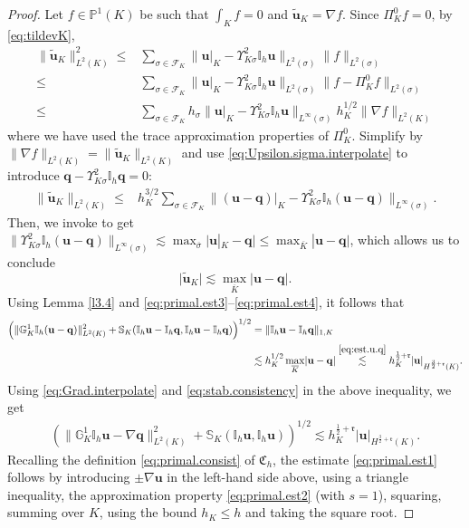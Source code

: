 \documentclass[a4paper,11pt]{article}
\theoremstyle{definition}
\theoremstyle{remark}
\newcommand{\norm}[2]{\|#2\|_{#1}}
\newcommand{\bo}[1]{\mathbf{#1}}
\newcommand{\bos}[1]{\boldsymbol{#1}}
\newcommand{\up}[1]{\Upsilon^2_{#1}}
\newcommand{\dgr}[1]{\mathbb G^1_{#1}}
\newcommand{\mI}[1]{\mathbb I_h\bo{#1}}
\def\P{\mathbb{P}}
\def\cF{\mathcal{F}}
\def\fr{\mathfrak{r}}
\def\fC{\mathfrak{C}}
\def\Ksig{{K\!\sigma}}
\begin{document}
\begin{proof}
Let $f\in\P^1(K)$ be such that $\int_K f=0$ and $\widetilde{\bo{u}}_K=\nabla f.$ Since $\Pi^0_Kf=0$, by \eqref{eq:tildevK},
\begin{align*}
\norm{L^2(K)}{\widetilde{\bo{u}}_K}^2\le{}&\sum_{\sigma\in\cF_K}\norm{L^2(\sigma)}{\bo{u}|_K-\up{\Ksig}\mathbb I_h\bo{u}}\norm{L^2(\sigma)}{f}\\
\le{}&\sum_{\sigma\in\cF_K}\norm{L^2(\sigma)}{\bo{u}|_K-\up{\Ksig}\mathbb I_h\bo{u}}\norm{L^2(\sigma)}{f-\Pi^0_K f}\\
\le{}&\sum_{\sigma\in\cF_K}h_\sigma\norm{L^\infty(\sigma)}{\bo{u}|_K-\up{\Ksig}\mathbb I_h\bo{u}}h_K^{1/2}\norm{L^2(K)}{\nabla f}
\end{align*}
where we have used the trace approximation properties of $\Pi^0_K$. Simplify by $\norm{L^2(K)}{\nabla f}=\norm{L^2(K)}{\widetilde{\bo{u}}_K}$ and use \eqref{eq:Upsilon.sigma.interpolate} to introduce $\bo{q}-\up{\Ksig}\mathbb I_h\bo{q}=0$:
\begin{align*}
\norm{L^2(K)}{\widetilde{\bo{u}}_K}\le{}&h_K^{3/2}\sum_{\sigma\in\cF_K}\norm{L^\infty(\sigma)}{(\bo{u}-\bo{q})|_K-\up{\Ksig}\mI{(\bo{u}-\bo{q})}}.
\end{align*}
Then, we invoke \cite[(A.10)]{Di-Pietro.Droniou.ea:24} to get $\norm{L^\infty(\sigma)}{\up{\Ksig}\mI{(\bo{u}-\bo{q})}}\lesssim \max_{\overline{\sigma}}\big|\bo{u}|_K-\bo{q}\big|\le \max_{\overline{K}}|\bo{u}-\bo{q}|$,
which allows us to conclude
\begin{equation}\label{eq:primal.est4}
\lvert\widetilde{\bo{u}}_K\rvert\lesssim \max\limits_{\overline{K}}\lvert\bo{u-q}\rvert.
\end{equation}
Using Lemma \ref{l3.4} and \eqref{eq:primal.est3}–\eqref{eq:primal.est4}, it follows that
\begin{align*}
\left(\lVert \dgr{K}\mI{(u-q)}\rVert^2_{L^2(K)}+\mathbb S_K(\mI{u}-\mI{q},\mI{u}-\mI{q})\right)^{1/2}&=\lVert \mI{u}-\mI{q}\rVert_{1,K}\\
&\lesssim h^{1/2}_K \max\limits_{\overline{K}}\lvert \bo{u-q}\rvert\overset{\eqref{eq:est.u.q}}\lesssim h^{\frac{1}{2}+\fr}_K\lvert \bo{u}\rvert_{H^{\frac{3}{2}+\fr}(K)}.
\end{align*}
Using \eqref{eq:Grad.interpolate} and \eqref{eq:stab.consistency} in the above inequality, we get
\begin{align*}
\left(\lVert \dgr{K}\mI{u}-\nabla \bo{q}\rVert^2_{L^2(K)}+\mathbb S_K(\mI{u},\mI{u})\right)^{1/2}\lesssim h^{\frac{1}{2}+\fr}_K\lvert \bo{u}\rvert_{H^{\frac{3}{2}+\fr}(K)}.
\end{align*}
Recalling the definition \eqref{eq:primal.consist} of $\bos{\fC}_h$, the estimate \eqref{eq:primal.est1} follows by introducing $\pm\nabla\bo{u}$ in the left-hand side above, using a triangle inequality, the approximation property \eqref{eq:primal.est2} (with $s=1$), squaring, summing over $K$, using the bound $h_K\leq h$ and taking the square root. 
\end{proof}
\end{document}
